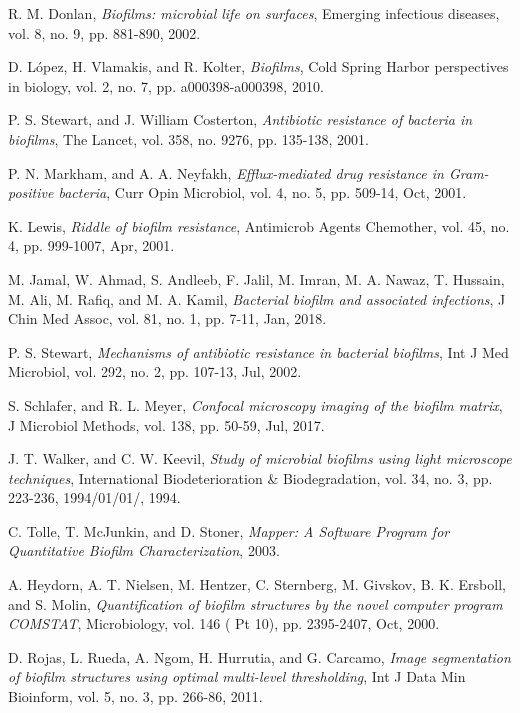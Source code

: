 \documentclass[conference]{IEEEtran}
\begin{document}
\begin{thebibliography}{1}

R. M. Donlan, \emph{Biofilms: microbial life on surfaces}, Emerging infectious diseases, vol. 8, no. 9, pp. 881-890, 2002.

D. L\'opez, H. Vlamakis, and R. Kolter, \emph{Biofilms}, Cold Spring Harbor perspectives in biology, vol. 2, no. 7, pp. a000398-a000398, 2010.

P. S. Stewart, and J. William Costerton, \emph{Antibiotic resistance of bacteria in biofilms}, The Lancet, vol. 358, no. 9276, pp. 135-138, 2001.

P. N. Markham, and A. A. Neyfakh, \emph{Efflux-mediated drug resistance in Gram-positive bacteria}, Curr Opin Microbiol, vol. 4, no. 5, pp. 509-14, Oct, 2001.

K. Lewis, \emph{Riddle of biofilm resistance}, Antimicrob Agents Chemother, vol. 45, no. 4, pp. 999-1007, Apr, 2001.

M. Jamal, W. Ahmad, S. Andleeb, F. Jalil, M. Imran, M. A. Nawaz, T. Hussain, M. Ali, M. Rafiq, and M. A. Kamil, \emph{Bacterial biofilm and associated infections}, J Chin Med Assoc, vol. 81, no. 1, pp. 7-11, Jan, 2018.

P. S. Stewart, \emph{Mechanisms of antibiotic resistance in bacterial biofilms}, Int J Med Microbiol, vol. 292, no. 2, pp. 107-13, Jul, 2002.

S. Schlafer, and R. L. Meyer, \emph{Confocal microscopy imaging of the biofilm matrix}, J Microbiol Methods, vol. 138, pp. 50-59, Jul, 2017.

J. T. Walker, and C. W. Keevil, \emph{Study of microbial biofilms using light microscope techniques}, International Biodeterioration \& Biodegradation, vol. 34, no. 3, pp. 223-236, 1994/01/01/, 1994.

C. Tolle, T. McJunkin, and D. Stoner, \emph{Mapper: A Software Program for Quantitative Biofilm Characterization}, 2003.

A. Heydorn, A. T. Nielsen, M. Hentzer, C. Sternberg, M. Givskov, B. K. Ersboll, and S. Molin, \emph{Quantification of biofilm structures by the novel computer program COMSTAT}, Microbiology, vol. 146 ( Pt 10), pp. 2395-2407, Oct, 2000.

D. Rojas, L. Rueda, A. Ngom, H. Hurrutia, and G. Carcamo, \emph{Image segmentation of biofilm structures using optimal multi-level thresholding}, Int J Data Min Bioinform, vol. 5, no. 3, pp. 266-86, 2011.


\end{thebibliography}
\end{document}
